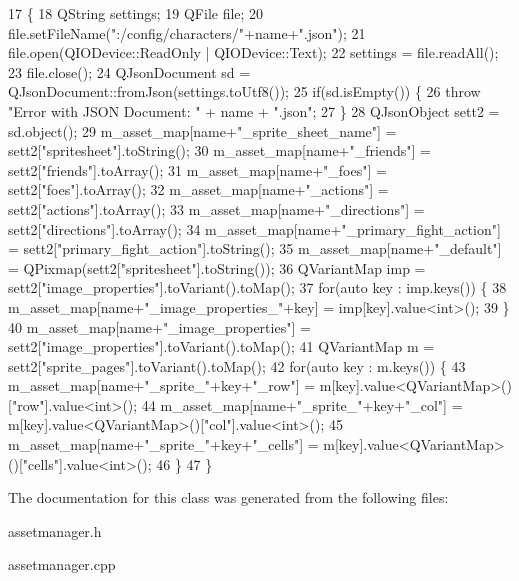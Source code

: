 \begin{DoxyCode}
17                                            \{
18     QString settings;
19     QFile file;
20     file.setFileName(\textcolor{stringliteral}{":/config/characters/"}+name+\textcolor{stringliteral}{".json"});
21     file.open(QIODevice::ReadOnly | QIODevice::Text);
22     settings = file.readAll();
23     file.close();
24     QJsonDocument sd = QJsonDocument::fromJson(settings.toUtf8());
25     \textcolor{keywordflow}{if}(sd.isEmpty()) \{
26         \textcolor{keywordflow}{throw} \textcolor{stringliteral}{"Error with JSON Document: "} + name + \textcolor{stringliteral}{".json"};
27     \}
28     QJsonObject sett2 = sd.object();
29     m\_asset\_map[name+\textcolor{stringliteral}{"\_sprite\_sheet\_name"}] = sett2[\textcolor{stringliteral}{"spritesheet"}].toString();
30     m\_asset\_map[name+\textcolor{stringliteral}{"\_friends"}] = sett2[\textcolor{stringliteral}{"friends"}].toArray();
31     m\_asset\_map[name+\textcolor{stringliteral}{"\_foes"}] = sett2[\textcolor{stringliteral}{"foes"}].toArray();
32     m\_asset\_map[name+\textcolor{stringliteral}{"\_actions"}] = sett2[\textcolor{stringliteral}{"actions"}].toArray();
33     m\_asset\_map[name+\textcolor{stringliteral}{"\_directions"}] = sett2[\textcolor{stringliteral}{"directions"}].toArray();
34     m\_asset\_map[name+\textcolor{stringliteral}{"\_primary\_fight\_action"}] = sett2[\textcolor{stringliteral}{"primary\_fight\_action"}].toString();
35     m\_asset\_map[name+\textcolor{stringliteral}{"\_default"}] = QPixmap(sett2[\textcolor{stringliteral}{"spritesheet"}].toString());
36     QVariantMap imp = sett2[\textcolor{stringliteral}{"image\_properties"}].toVariant().toMap();
37     \textcolor{keywordflow}{for}(\textcolor{keyword}{auto} key : imp.keys()) \{
38         m\_asset\_map[name+\textcolor{stringliteral}{"\_image\_properties\_"}+key] = imp[key].value<\textcolor{keywordtype}{int}>();
39     \}
40     m\_asset\_map[name+\textcolor{stringliteral}{"\_image\_properties"}] = sett2[\textcolor{stringliteral}{"image\_properties"}].toVariant().toMap();
41     QVariantMap m = sett2[\textcolor{stringliteral}{"sprite\_pages"}].toVariant().toMap();
42     \textcolor{keywordflow}{for}(\textcolor{keyword}{auto} key : m.keys()) \{
43         m\_asset\_map[name+\textcolor{stringliteral}{"\_sprite\_"}+key+\textcolor{stringliteral}{"\_row"}] = m[key].value<QVariantMap>()[\textcolor{stringliteral}{"row"}].value<int>();
44         m\_asset\_map[name+\textcolor{stringliteral}{"\_sprite\_"}+key+\textcolor{stringliteral}{"\_col"}] = m[key].value<QVariantMap>()[\textcolor{stringliteral}{"col"}].value<int>();
45         m\_asset\_map[name+\textcolor{stringliteral}{"\_sprite\_"}+key+\textcolor{stringliteral}{"\_cells"}] = m[key].value<QVariantMap>()[\textcolor{stringliteral}{"cells"}].value<int>();
46     \}
47 \}
\end{DoxyCode}


The documentation for this class was generated from the following files\+:\begin{DoxyCompactItemize}
\item 
assetmanager.\+h\item 
assetmanager.\+cpp\end{DoxyCompactItemize}
